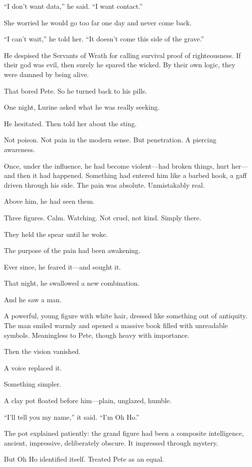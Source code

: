 “I don’t want data,” he said. “I want contact.”

She worried he would go too far one day and never come back.

“I can’t wait,” he told her. “It doesn’t come this side of the grave.”

He despised the Servants of Wrath for calling survival proof of righteousness. If their god was evil, then surely he spared the wicked. By their own logic, they were damned by being alive.

That bored Pete. So he turned back to his pills.

One night, Lurine asked what he was really seeking.

He hesitated. Then told her about the sting.

Not poison. Not pain in the modern sense. But penetration. A piercing awareness.

Once, under the influence, he had become violent—had broken things, hurt her—and then it had happened. Something had entered him like a barbed hook, a gaff driven through his side. The pain was absolute. Unmistakably real.

Above him, he had seen them.

Three figures. Calm. Watching. Not cruel, not kind. Simply there.

They held the spear until he woke.

The purpose of the pain had been awakening.

Ever since, he feared it—and sought it.

That night, he swallowed a new combination.

And he saw a man.

A powerful, young figure with white hair, dressed like something out of antiquity. The man smiled warmly and opened a massive book filled with unreadable symbols. Meaningless to Pete, though heavy with importance.

Then the vision vanished.

A voice replaced it.

Something simpler.

A clay pot floated before him—plain, unglazed, humble.

“I’ll tell you my name,” it said. “I’m Oh Ho.”

The pot explained patiently: the grand figure had been a composite intelligence, ancient, impressive, deliberately obscure. It impressed through mystery.

But Oh Ho identified itself. Treated Pete as an equal.

